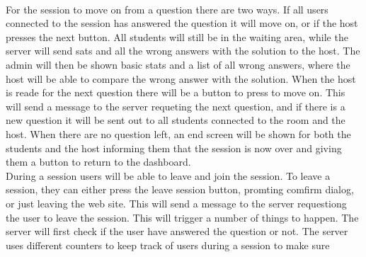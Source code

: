 \\[11pt]
For the session to move on from a question there are two ways. If all users connected to the session has answered the question it will move on, or if the host presses the next button. All students will still be in the waiting area, while the server will send sats and all the wrong answers with the solution to the host. The admin will then be shown basic stats and a list of all wrong answers, where the host will be able to compare the wrong answer with the solution. When the host is reade for the next question there will be a button to press to move on. This will send a message to the server requeting the next question, and if there is a new question it will be sent out to all students connected to the room and the host. When there are no question left, an end screen will be shown for both the students and the host informing them that the session is now over and giving them a button to return to the dashboard.
\\[11pt]
During a session users will be able to leave and join the session. To leave a session, they can either press the leave session button, promting comfirm dialog, or just leaving the web site. This will send a message to the server requestiong the user to leave the session. This will trigger a number of things to happen. The server will first check if the user have answered the question or not. The server uses different counters to keep track of users during a session to make sure 